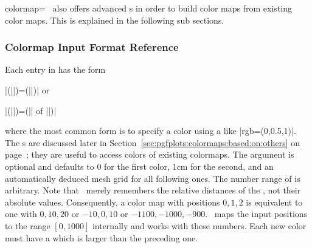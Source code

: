 \begin{pgfplotskey}{colormap=}
	\PGFPlots\ also offers advanced s in order to build color maps from existing color maps. This is explained in the following sub sections.

\subsubsection{Colormap Input Format Reference}
\label{sec:colormap:input:format}%
Each entry in  has the form 

	|(||)=(||)| or

	|(||)=(|| of ||)|

where the most common form is to specify a color using a  like |rgb=(0,0.5,1)|. The s are discussed later in Section~\ref{sec:pgfplots:colormaps:based:on:others} on page~\pageref{sec:pgfplots:colormaps:based:on:others}; they are useful to access colors of existing colormaps. The  argument is optional and defaults to $0$ for the first color, $1\text{cm}$ for the second, and an automatically deduced mesh grid for all following ones. The number range of  is arbitrary. Note that \PGFPlots\ merely remembers the relative distances of the , not their absolute values. Consequently, a color map with positions $0,1,2$ is equivalent to one with $0,10,20$ or $-10,0,10$ or $-1100,-1000,-900$. \PGFPlots\ maps the input positions to the range $[0,1000]$ internally and works with these numbers. Each new color must have a  which is larger than the preceding one.


\end{pgfplotskey}
